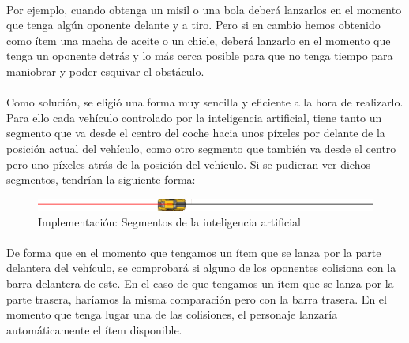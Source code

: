 \paragraph{}
Por ejemplo, cuando obtenga un misil o una bola deberá lanzarlos en el momento que tenga algún oponente delante y a tiro. Pero si
en cambio hemos obtenido como ítem una macha de aceite o un chicle, deberá lanzarlo en el momento que tenga un oponente detrás
y lo más cerca posible para que no tenga tiempo para maniobrar y poder esquivar el obstáculo.

\paragraph{}
Como solución, se eligió una forma muy sencilla y eficiente a la hora de realizarlo. Para ello cada vehículo controlado por la
inteligencia artificial, tiene tanto un segmento que va desde el centro del
coche hacia unos píxeles por delante de la posición
actual del vehículo, como otro segmento que también va desde el centro pero uno
píxeles atrás de la posición del vehículo. 
Si se pudieran ver dichos segmentos, tendrían la siguiente forma:

\begin{figure}[H]
  \label{ia_segmentos}
  \begin{center}
    \includegraphics[scale=0.8]{imagenes/ia_segmentos.png}
  \end{center}
  \caption{Implementación: Segmentos de la inteligencia artificial}
\end{figure}

\paragraph{}
De forma que en el momento que tengamos un ítem que se lanza por la parte delantera del vehículo, se comprobará si alguno de los 
oponentes colisiona con la barra delantera de este. En el caso de que tengamos
un ítem que se lanza por la parte trasera, haríamos
la misma comparación pero con la barra trasera. En el momento que tenga lugar una de las colisiones, el personaje lanzaría
automáticamente el ítem disponible.
